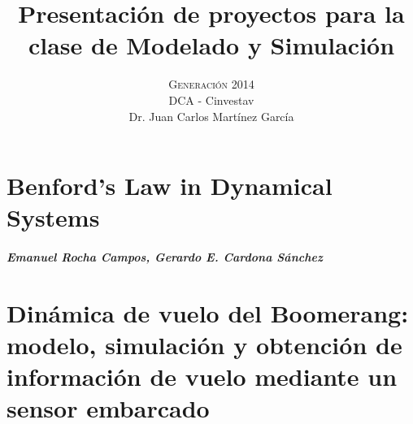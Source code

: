 



\title{\vspace{-15mm}\fontsize{24pt}{10pt}\selectfont\textbf{Presentación de proyectos para la clase de Modelado y Simulación}} %

\author{
\large \textsc{Generación 2014}\\[2mm] %
\normalsize DCA - Cinvestav \\ %
\normalsize Dr. Juan Carlos Martínez García %
\vspace{-5mm}
}
\date{}




    \maketitle %
    \thispagestyle{fancy} %
    \tableofcontents


    \chapter{Benford's Law in Dynamical Systems}
    \paragraph{Emanuel Rocha Campos, Gerardo E. Cardona Sánchez}
    

    \chapter{Dinámica de vuelo del Boomerang: modelo, simulación y obtención de información de vuelo mediante un sensor embarcado}
